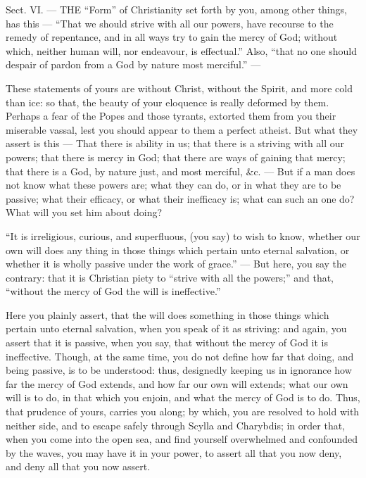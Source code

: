 
Sect. VI. — THE “Form” of Christianity set forth by you, among other things, has this — “That we should strive with all our powers, have recourse to the remedy of repentance, and in all ways try to gain the mercy of God; without which, neither human will, nor endeavour, is effectual.” Also, “that no one should despair of pardon from a God by nature most merciful.” —

These statements of yours are without Christ, without the Spirit, and more cold than ice: so that, the beauty of your eloquence is really deformed by them. Perhaps a fear of the Popes and those tyrants, extorted them from you their miserable vassal, lest you should appear to them a perfect atheist. But what they assert is this — That there is ability in us; that there is a striving with all our powers; that there is mercy in God; that there are ways of gaining that mercy; that there is a God, by nature just, and most merciful, \&c. — But if a man does not know what these powers are; what they can do, or in what they are to be passive; what their efficacy, or what their inefficacy is; what can such an one do? What will you set him about doing?

“It is irreligious, curious, and superfluous, (you say) to wish to know, whether our own will does any thing in those things which pertain unto eternal salvation, or whether it is wholly passive under the work of grace.” — But here, you say the contrary: that it is Christian piety to “strive with all the powers;” and that, “without the mercy of God the will is ineffective.”

Here you plainly assert, that the will does something in those things which pertain unto eternal salvation, when you speak of it as striving: and again, you assert that it is passive, when you say, that without the mercy of God it is ineffective. Though, at the same time, you do not define how far that doing, and being passive, is to be understood: thus, designedly keeping us in ignorance how far the mercy of God extends, and how far our own will extends; what our own will is to do, in that which you enjoin, and what the mercy of God is to do. Thus, that prudence of yours, carries you along; by which, you are resolved to hold with neither side, and to escape safely through Scylla and Charybdis; in order that, when you come into the open sea, and find yourself overwhelmed and confounded by the waves, you may have it in your power, to assert all that you now deny, and deny all that you now assert.


